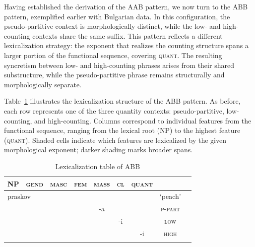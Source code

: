 \documentclass[output=paper,colorlinks,citecolor=brown
]{langscibook}
\begin{document}
Having established the derivation of the AAB pattern, we now turn to the ABB pattern, exemplified earlier with Bulgarian data. In this configuration, the pseudo-partitive context is morphologically distinct, while the low- and high-counting contexts share the same suffix. This pattern reflects a different lexicalization strategy: the exponent that realizes the counting structure spans a larger portion of the functional sequence, covering \textsc{quant}. The resulting syncretism between low- and high-counting phrases arises from their shared substructure, while the pseudo-partitive phrase remains structurally and morphologically separate.

Table~\ref{zoha:tab:lexABB} illustrates the lexicalization structure of the ABB pattern. As before, each row represents one of the three quantity contexts: pseudo-partitive, low-counting, and high-counting. Columns correspond to individual features from the functional sequence, ranging from the lexical root (\textsc{NP}) to the highest feature (\textsc{quant}). Shaded cells indicate which features are lexicalized by the given morphological exponent; darker shading marks broader spans.

\begin{table}
\begin{tabularx}{0.75\textwidth}{ccccccccc}
\lsptoprule
\textsc{NP}&{\textsc{gend}} & {\textsc{masc}} & {\textsc{fem}} & {\textsc{mass}} & {\textsc{cl}} & {\textsc{quant}}\\
\midrule
\multicolumn{2}{l}{\cellcolor[gray]{0.9}praskov} & {\cellcolor[gray]{0.9}}& {\cellcolor[gray]{0.9}} & {} & {} & {} &{`peach'}\\[.5ex]
\cellcolor[gray]{0.9} & {\cellcolor[gray]{0.9}} & {\cellcolor[gray]{0.9}} &{\cellcolor[gray]{0.8}} & {\cellcolor[gray]{0.8}-a} & {} & {} & {\textsc{p-part}}\\[.5ex]
\cellcolor[gray]{0.9} & {\cellcolor[gray]{0.9}} & {\cellcolor[gray]{0.9}} & {\cellcolor[gray]{0.7}} & {\cellcolor[gray]{0.7}} & {\cellcolor[gray]{0.7}-i} & {} & {\textsc{low}} \\[.5ex]
\cellcolor[gray]{0.9} & {\cellcolor[gray]{0.9}} & {\cellcolor[gray]{0.9}} & {\cellcolor[gray]{0.7}} & {\cellcolor[gray]{0.7}} & {\cellcolor[gray]{0.7}} & {\cellcolor[gray]{0.7}-i} & {\textsc{high}} \\[.5ex]
\lspbottomrule
\end{tabularx}
\caption{Lexicalization table of ABB}
\label{zoha:tab:lexABB}
\end{table}
\end{document}
